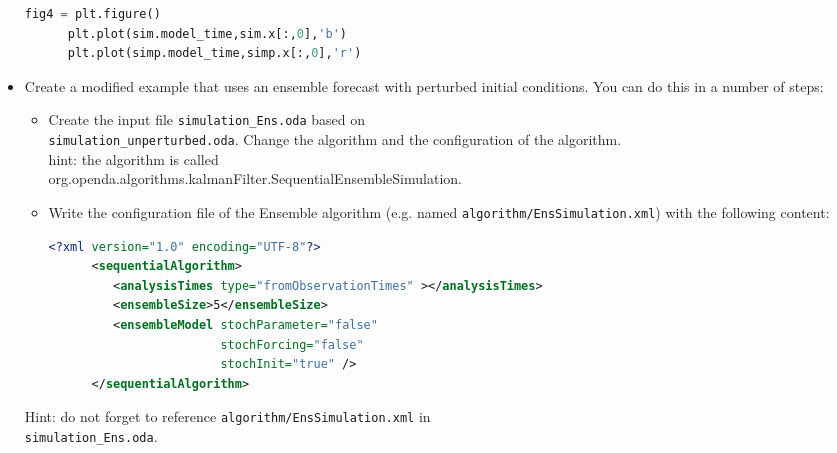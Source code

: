 \begin{itemize}
\begin{lstlisting}[language=Python,frame=single,caption={Python}]
      fig4 = plt.figure()
      plt.plot(sim.model_time,sim.x[:,0],'b')
      plt.plot(simp.model_time,simp.x[:,0],'r')
      \end{lstlisting}

\item Create a modified example that uses an ensemble forecast with perturbed
      initial conditions. You can do this in a number of steps:
      \begin{itemize}
      \item Create the input file {\tt simulation\_Ens.oda} based on\\
            {\tt simulation\_unperturbed.oda}. Change the algorithm and the
            configuration of the algorithm.\\
            hint: the algorithm is called \\
            org.openda.algorithms.kalmanFilter.SequentialEnsembleSimulation.
      \item Write the configuration file of the Ensemble algorithm (e.g. named
            {\tt algorithm/EnsSimulation.xml}) with the following content:
      \begin{lstlisting}[language=XML,frame=single,caption={XML-input for sequentialAlgorithm}]
      <?xml version="1.0" encoding="UTF-8"?>
      <sequentialAlgorithm>
         <analysisTimes type="fromObservationTimes" ></analysisTimes>
         <ensembleSize>5</ensembleSize>
         <ensembleModel stochParameter="false"
                        stochForcing="false"
                        stochInit="true" />
      </sequentialAlgorithm>
      \end{lstlisting}
      \end{itemize}
      Hint: do not forget to reference {\tt algorithm/EnsSimulation.xml} in \\ {\tt simulation\_Ens.oda}.




\end{itemize}
